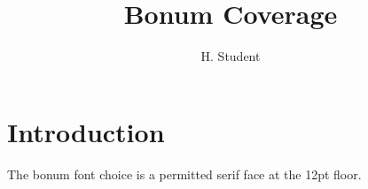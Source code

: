 \documentclass[phd,font=bonum,12pt,a4paper]{bangor}
\title{Bonum Coverage}
\author{H. Student}
\begin{document}
\maketitle
\chapter{Introduction}
The bonum font choice is a permitted serif face at the 12pt floor.
\end{document}
